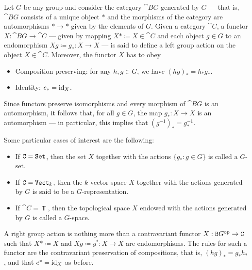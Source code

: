 \begin{example}\label{exp:grp-action}
    Let \(G\) be any group and consider the category \(\cat{B}G\) generated by \(G\)
    --- that is, \(\cat BG\) consists of a unique object \(*\) and the morphisms of
    the category are automorphisms \(* \to *\) given by the elements of \(G\). Given
    a category \(\cat C\), a functor \(X: \cat BG \to \cat C\) --- given by mapping
    \(X* \coloneq X \in \cat C\) and each object \(g \in G\) to an endomorphism
    \(Xg \coloneq g_{*}: X \to X\) --- is said to define a left group action on the
    object \(X \in \cat C\). Moreover, the functor \(X\) has to obey
    \begin{itemize}\setlength\itemsep{0em}
        \item Composition preserving: for any \(h, g \in G\), we have \((h g)_{*} =
              h_{*} g_{*}\).
        \item Identity: \(e_{*} = \operatorname{id}_X\).
    \end{itemize}
    Since functors preserve isomorphisms and every morphism of \(\cat BG\) is an
    automorphism, it follows that, for all \(g \in G\), the map \(g_{*}: X \to X\)
    is an automorphism --- in particular, this implies that \((g^{-1})_{*} =
    g_{*}^{-1}\).

    Some particular cases of interest are the following:
    \begin{itemize}\setlength\itemsep{0em}
        \item If \(\texttt C = {\texttt{Set}}\), then the set \(X\) together with the actions
              \(\{g_{*} \colon g \in G\}\) is called a \(G\)-set.
        \item If \(\texttt C = {\texttt{Vect}}_k\), then the \(k\)-vector space \(X\) together with
              the actions generated by \(G\) is said to be a \(G\)-representation.
        \item If \(\cat C = \Top\), then the topological space \(X\) endowed with the
              actions generated by \(G\) is called a \(G\)-space.
    \end{itemize}

    A right group action is nothing more than a contravariant functor \(X: \texttt
    BG^{\mathrm{op}} \to \texttt C\) such that \(X* \coloneq X\) and \(Xg \coloneq g^{*}: X \to
    X\) are endomorphisms. The rules for such a functor are the contravariant
    preservation of compositions, that is, \((h g)_{*} = g_{*} h_{*}\), and that
    \(e^{*} = \operatorname{id}_X\) as before.
\end{example}

